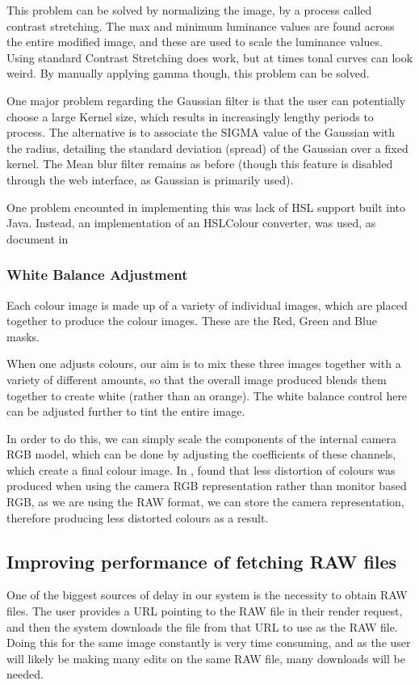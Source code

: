 \documentclass[11pt,a4paper]{article}
\begin{document}
    This problem can be solved by normalizing the image, by a process called contrast stretching. The max and minimum luminance values are found across the
    entire modified image, and these are used to scale the luminance values. Using standard Contrast Stretching does work, but at times tonal curves can look weird. By manually applying gamma though, this problem can be
    solved.

    One major problem regarding the Gaussian filter is that the user can potentially choose a large Kernel size, which results in increasingly lengthy
    periods to process. The alternative is to associate the SIGMA value of the Gaussian with the radius, detailing the standard deviation (spread) of the
    Gaussian over a fixed kernel. The Mean blur filter remains as before (though this feature is disabled through the web interface, as Gaussian is
    primarily used).

    One problem encounted in implementing this was lack of HSL support built into Java. Instead, an implementation of an HSLColour converter, was used,
    as document in \cite{HSLImplementation}
\subsubsection{White Balance Adjustment}
    Each colour image is made up of a variety of individual images, which are placed together
    to produce the colour images. These are the Red, Green and Blue masks.

    When one adjusts colours, our aim is to mix these three images together with a variety of different
    amounts, so that the overall image produced blends them together to create white (rather than an orange).
    The white balance control here can be adjusted further to tint the entire image.

    In order to do this, we can simply scale the components of the internal camera RGB model, which can be done
    by adjusting the coefficients of these channels, which create a final colour image. In \cite{WhiteBalance}, 
    found that less distortion of colours was produced when using the camera RGB representation rather than monitor based
    RGB, as we are using the RAW format, we can store the camera representation, therefore producing less distorted colours
    as a result.


\subsection{Improving performance of fetching RAW files}\label{LocalImageCaching}
One of the biggest sources of delay in our system is the necessity to obtain RAW files. The user
provides a URL pointing to the RAW file in their render request, and then the system downloads the file
from that URL to use as the RAW file. Doing this for the same image constantly is very time consuming, and
as the user will likely be making many edits on the same RAW file, many downloads will be needed.
\end{document}
